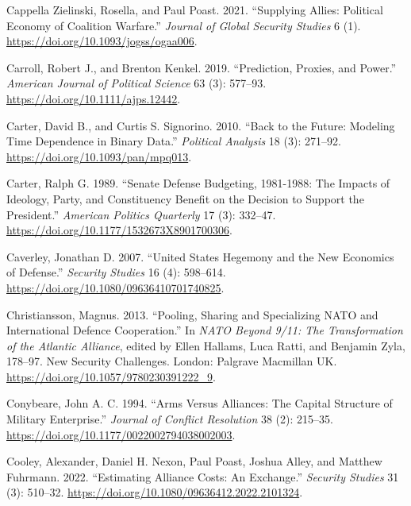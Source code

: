 \documentclass[
  12,
  letterpaper,
  DIV=11,
  numbers=noendperiod]{scrartcl}
\newlength{\cslhangindent}
\newlength{\cslentryspacingunit} %
\newenvironment{CSLReferences}[2] %
 {%
  \setlength{\parindent}{0pt}
  \ifodd #1
  \let\oldpar\par
  \def\par{\hangindent=\cslhangindent\oldpar}
  \fi
  \setlength{\parskip}{#2\cslentryspacingunit}
 }%
 {}
\begin{document}
\begin{CSLReferences}{1}{0}
\leavevmode{}%
Cappella Zielinski, Rosella, and Paul Poast. 2021. {``Supplying
{Allies}: {Political Economy} of {Coalition Warfare}.''} \emph{Journal
of Global Security Studies} 6 (1).
\url{https://doi.org/10.1093/jogss/ogaa006}.

\leavevmode{}%
Carroll, Robert J., and Brenton Kenkel. 2019. {``Prediction, {Proxies},
and {Power}.''} \emph{American Journal of Political Science} 63 (3):
577--93. \url{https://doi.org/10.1111/ajps.12442}.

\leavevmode{}%
Carter, David B., and Curtis S. Signorino. 2010. {``Back to the
{Future}: {Modeling Time Dependence} in {Binary Data}.''}
\emph{Political Analysis} 18 (3): 271--92.
\url{https://doi.org/10.1093/pan/mpq013}.

\leavevmode{}%
Carter, Ralph G. 1989. {``Senate {Defense Budgeting}, 1981-1988: {The
Impacts} of {Ideology}, {Party}, and {Constituency Benefit} on the
{Decision} to {Support} the {President}.''} \emph{American Politics
Quarterly} 17 (3): 332--47.
\url{https://doi.org/10.1177/1532673X8901700306}.

\leavevmode{}%
Caverley, Jonathan D. 2007. {``United {States Hegemony} and the {New
Economics} of {Defense}.''} \emph{Security Studies} 16 (4): 598--614.
\url{https://doi.org/10.1080/09636410701740825}.

\leavevmode{}%
Christiansson, Magnus. 2013. {``Pooling, {Sharing} and {Specializing}
\textemdash{} {NATO} and {International Defence Cooperation}.''} In
\emph{{NATO} Beyond 9/11: {The Transformation} of the {Atlantic
Alliance}}, edited by Ellen Hallams, Luca Ratti, and Benjamin Zyla,
178--97. New {Security Challenges}. {London}: {Palgrave Macmillan UK}.
\url{https://doi.org/10.1057/9780230391222_9}.

\leavevmode{}%
Conybeare, John A. C. 1994. {``Arms {Versus Alliances}: {The Capital
Structure} of {Military Enterprise}.''} \emph{Journal of Conflict
Resolution} 38 (2): 215--35.
\url{https://doi.org/10.1177/0022002794038002003}.

\leavevmode{}%
Cooley, Alexander, Daniel H. Nexon, Paul Poast, Joshua Alley, and
Matthew Fuhrmann. 2022. {``Estimating {Alliance Costs}: {An
Exchange}.''} \emph{Security Studies} 31 (3): 510--32.
\url{https://doi.org/10.1080/09636412.2022.2101324}.


\end{CSLReferences}
\end{document}
